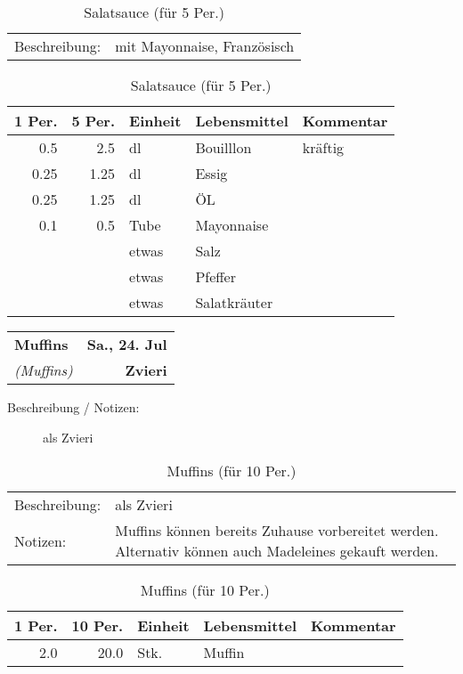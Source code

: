 \documentclass[11pt,a4paper]{article}%
\begin{document}
%
\vspace{0.75cm}%
\renewcommand{\arraystretch}{1.25}%


\begin{table}[h]%
\caption{Salatsauce (für 5 Per.)}%
\begin{tabularx}{\textwidth}{l X}%
Beschreibung: & mit Mayonnaise, Französisch\\%
\end{tabularx}%
\par%
\begin{tabularx}{\textwidth}{| r | r | l | l | X |}%
\hline%
\tiny{1 Per.}&\tiny{5 Per.}&\tiny{Einheit}&\tiny{Lebensmittel}&\tiny{Kommentar}\\%
\hline%
0.5&2.5&dl&Bouilllon&kräftig\\%
\hline%
0.25&1.25&dl&Essig&\\%
\hline%
0.25&1.25&dl&ÖL&\\%
\hline%
0.1&0.5&Tube&Mayonnaise&\\%
\hline%
&&etwas&Salz&\\%
\hline%
&&etwas&Pfeffer&\\%
\hline%
&&etwas&Salatkräuter&\\%
\hline%
\end{tabularx}%
\end{table}

%
\clearpage%
\pagebreak%
\renewcommand{\arraystretch}{1.75}%
%
%


\begin{table}%
\begin{tabularx}{\textwidth}{X r}%
\LARGE \textbf{Muffins}&\color{gray} \large \textbf{Sa., 24. Jul}\\%
\small \textit{(Muffins)}&\color{gray} \large \textbf{Zvieri}\\%
\hline%
\end{tabularx}%
\end{table}

%
\begin{description}%
\item[Beschreibung / Notizen:]%
als Zvieri%
\end{description}%
\vspace{0.75cm}%
\renewcommand{\arraystretch}{1.25}%


\begin{table}[h]%
\caption{Muffins (für 10 Per.)}%
\begin{tabularx}{\textwidth}{l X}%
Beschreibung: &als Zvieri\\%
Notizen:&Muffins können bereits Zuhause vorbereitet werden. Alternativ können auch Madeleines gekauft werden.\\%
\end{tabularx}%
\par%
\begin{tabularx}{\textwidth}{| r | r | l | l | X |}%
\hline%
\tiny{1 Per.}&\tiny{10 Per.}&\tiny{Einheit}&\tiny{Lebensmittel}&\tiny{Kommentar}\\%
\hline%
2.0&20.0&Stk.&Muffin&\\%
\hline%
\end{tabularx}%
\end{table}
\end{document}

